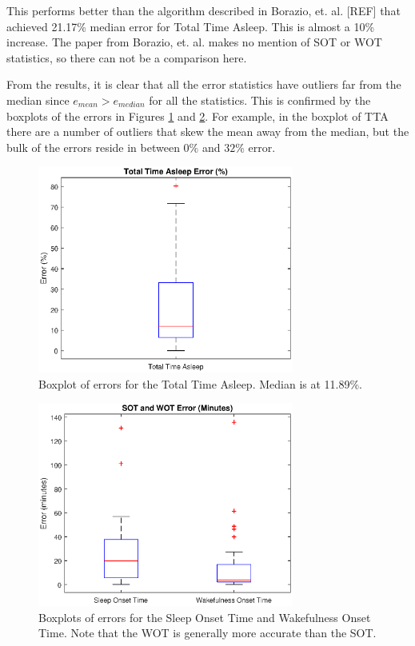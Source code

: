             This performs better than the algorithm described in Borazio, et. al. [REF] that achieved 21.17\% median error for Total Time Asleep. This is almost a 10\% increase. The paper from Borazio, et. al. makes no mention of SOT or WOT statistics, so there can not be a comparison here.

            From the results, it is clear that all the error statistics have outliers far from the median since $e_{mean} > e_{median}$ for all the statistics. This is confirmed by the boxplots of the errors in Figures \ref{img_tta_error} and \ref{img_sot_wot_error}. For example, in the boxplot of TTA there are a number of outliers that skew the mean away from the median, but the bulk of the errors reside in between $0\%$ and $32\%$ error. 

            \begin{figure}[h]
                \includegraphics[width=0.75\textwidth]{Images/tta_error.eps}
                \centering
                \caption{Boxplot of errors for the Total Time Asleep. Median is at 11.89\%.}
                \label{img_tta_error}
            \end{figure}

            \begin{figure}[h]
                \includegraphics[width=0.75\textwidth]{Images/sot_wot_error.eps}
                \centering
                \caption{Boxplots of errors for the Sleep Onset Time and Wakefulness Onset Time. Note that the WOT is generally more accurate than the SOT.}
                \label{img_sot_wot_error}
            \end{figure}

